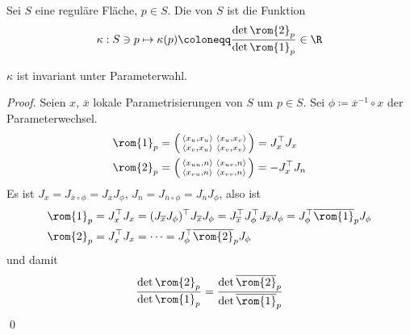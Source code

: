 \begin{definition}
  Sei $ S $ eine reguläre Fläche, $ p \in S $. Die \label{def:gaussKruemmung} von $ S $ ist die Funktion
  \begin{equation*}
    \kappa: S \ni p \mapsto \kappa(p) \coloneqq \frac{\det \rom{2}_p}{\det \rom{1}_p} \in \R
  \end{equation*}
\end{definition}

\begin{remark}
  $ \kappa $ ist invariant unter Parameterwahl.
  \begin{proof}
    Seien $ x $, $ \overline{x} $ lokale Parametrisierungen von $ S $ um $ p \in S $. Sei $ \phi \coloneqq \overline{x}^{-1} \circ x $ der Parameterwechsel.
    \begin{align*}
      \rom{1}_p &= \left( \begin{smallmatrix}
        \langle x_u,x_u \rangle & \langle x_u,x_v \rangle \\
        \langle x_v,x_u \rangle & \langle x_v,x_v \rangle
      \end{smallmatrix} \right) = J_x^\top J_x \\
      \rom{2}_p &= \left( \begin{smallmatrix}
        \langle x_{uu}, n \rangle & \langle x_{uv}, n \rangle \\ 
        \langle x_{vu}, n \rangle & \langle x_{vv}, n \rangle
      \end{smallmatrix} \right) = -J_x^\top J_n
    \end{align*}
    Es ist $ J_x = J_{\overline{x} \circ \phi} = J_{\overline{x}}J_\phi $, $ J_n = J_{\overline{n} \circ \phi} = J_{\overline{n}}J_\phi $, also ist
    \begin{align*}
      \rom{1}_p &= J_x^\top J_x = (J_{\overline{x}}J_\phi)^\top J_{\overline{x}}J_\phi = J_{\overline{x}}^\top J_\phi^\top J_{\overline{x}} J_\phi = J_\phi^\top \overline{\rom{1}}_p J_\phi \\
      \rom{2}_p &= J_x^\top J_x = \cdots = J_\phi^\top \overline{\rom{2}}_p J_\phi
    \end{align*}
    und damit
    \begin{equation*}
      \frac{\det \rom{2}_p}{\det \rom{1}_p} = \frac{\det \overline{\rom{2}}_p}{\det \overline{\rom{1}}_p}
    \end{equation*} \qed
  \end{proof}
\end{remark}

